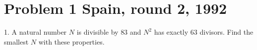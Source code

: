 \documentclass[]{article}
\title{}
\author{}
\begin{document}
\maketitle

\begin{abstract}

\end{abstract}

\section{Problem 1 Spain, round 2, 1992}
1. A natural number $N$ is divisible by $83$ and $N^2$ has exactly $63$ divisors. Find the smallest $N$ with these properties.
\end{document}
